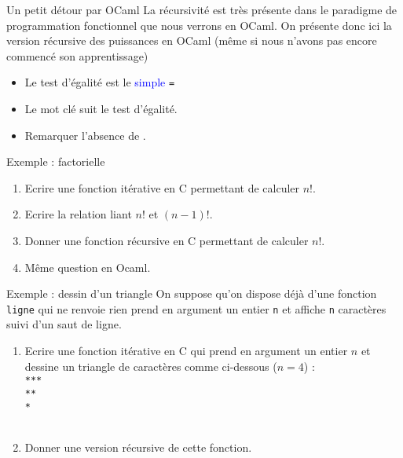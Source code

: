 \documentclass[10pt]{beamer}
\begin{document}
\begin{frame}[fragile]{\Ctitle}{\stitle}
	\begin{block}{Un petit détour par OCaml}
		La récursivité est très présente dans le paradigme de programmation fonctionnel que nous verrons en OCaml.
		On présente donc ici la version récursive des puissances en OCaml (même si nous n'avons pas encore commencé son apprentissage)
		\begin{itemize}
			\item<2-> Le test d'égalité est le \textcolor{blue}{simple} {\tt =}
			\item<3-> Le mot clé  suit le test d'égalité.
			\item<3-> Remarquer l'absence de .
		\end{itemize}
	\end{block}
\end{frame}


\begin{frame}[fragile]{\Ctitle}{\stitle}
	\begin{exampleblock}{Exemple : factorielle}
		\begin{enumerate}
			\item<1-> Ecrire une fonction itérative en C permettant de calculer $n!$.
			\item<2-> Ecrire la relation liant $n!$ et $(n-1)!$.
			\item<3-> Donner une fonction récursive en C permettant de calculer $n!$.
			\item<4-> Même question en Ocaml.
		\end{enumerate}
	\end{exampleblock}
	\begin{exampleblock}{Exemple : dessin d'un triangle}
		\onslide<5->On suppose qu'on dispose déjà d'une fonction {\tt ligne} qui ne renvoie rien prend en argument un entier {\tt n} et affiche {\tt n} caractères {\tt *} suivi d'un saut de ligne.
		\begin{enumerate}
			\item<6-> Ecrire une fonction itérative en C qui prend en argument un entier $n$ et dessine un triangle de caractères
				{\tt *}comme ci-dessous ($n=4$) : \\
				{\tt ****} \\
				{\tt ***} \\
				{\tt **} \\
				{\tt *} \\
			\item<7-> Donner une version récursive de cette fonction.
		\end{enumerate}
	\end{exampleblock}
\end{frame}
\end{document}
